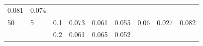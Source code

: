 \documentclass[12pt,oneside,a4paper]{reedthesis}
\begin{document}
\begin{longtable}[]{@{}lllllllll@{}}
\begin{minipage}[t]{0.08\columnwidth}
0.081\strut
\end{minipage} & \begin{minipage}[t]{0.08\columnwidth}\raggedright
0.074\strut
\end{minipage}\tabularnewline
\begin{minipage}[t]{0.12\columnwidth}\raggedright
50\strut
\end{minipage} & \begin{minipage}[t]{0.09\columnwidth}\raggedright
5\strut
\end{minipage} & \begin{minipage}[t]{0.06\columnwidth}\raggedright
0.1\strut
\end{minipage} & \begin{minipage}[t]{0.08\columnwidth}\raggedright
0.073\strut
\end{minipage} & \begin{minipage}[t]{0.08\columnwidth}\raggedright
0.061\strut
\end{minipage} & \begin{minipage}[t]{0.08\columnwidth}\raggedright
0.055\strut
\end{minipage} & \begin{minipage}[t]{0.08\columnwidth}\raggedright
0.06\strut
\end{minipage} & \begin{minipage}[t]{0.08\columnwidth}\raggedright
0.027\strut
\end{minipage} & \begin{minipage}[t]{0.08\columnwidth}\raggedright
0.082\strut
\end{minipage}\tabularnewline
\begin{minipage}[t]{0.12\columnwidth}\raggedright
\strut
\end{minipage} & \begin{minipage}[t]{0.09\columnwidth}\raggedright
\strut
\end{minipage} & \begin{minipage}[t]{0.06\columnwidth}\raggedright
0.2\strut
\end{minipage} & \begin{minipage}[t]{0.08\columnwidth}\raggedright
0.061\strut
\end{minipage} & \begin{minipage}[t]{0.08\columnwidth}\raggedright
0.065\strut
\end{minipage} & \begin{minipage}[t]{0.08\columnwidth}\raggedright
0.052\strut
\end{minipage} & \begin{minipage}[t]{0.08\columnwidth}\raggedright

\end{minipage}
\end{longtable}
\end{document}
